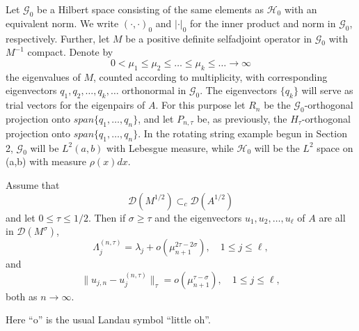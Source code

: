 \documentclass[final]{siamltex}
\numberwithin{equation}{section}
\begin{document}
Let $\mathcal{G}_0$ be a Hilbert space consisting of the same elements as $\mathcal{H}_0$ with an equivalent norm. We write $\left( \cdot, \cdot\right)_0$ and
$| \cdot |_0$ for the inner product and norm in $\mathcal{G}_0$, respectively. Further, let $M$ be a positive definite selfadjoint operator in $\mathcal{G}_0$ with
$M^{-1}$ compact. Denote by
\[0<\mu_1\le \mu_2 \le \ldots \le \mu_k \le \ldots \to \infty\]
the eigenvalues of $M$, counted according to multiplicity, with corresponding eigenvectors $q_1, q_2, \ldots, q_k, \ldots$ orthonormal in $\mathcal{G}_0$.  The eigenvectors $\{q_k \}$ will serve as trial vectors for the eigenpairs of $A$. For this purpose let $R_n$ be the $\mathcal{G}_0$-orthogonal
projection onto $span \{q_1, \ldots, q_n \}$, and
let $P_{n, \tau}$ be, as previously, the $H_{\tau}$-orthogonal projection onto
$span \{q_1, \ldots, q_n \}$.
In the rotating string example begun in Section 2, $\mathcal{G}_0$ will be $L^2(a,b)$ with Lebesgue measure, while $\mathcal{H}_0$ will be the $L^2$ space on (a,b) with measure $\rho(x) dx$.

\begin{proposition} \label{prop4.2} Assume that
\begin{equation} \label{4.1}
\mathcal{D}\left(M^{1/2}\right) \subset_{c} \mathcal{D}\left(A^{1/2}\right)
\end{equation}
and let $0 \le \tau \le 1/2$. Then if $\sigma \ge \tau$ and the eigenvectors $u_1, u_2, \ldots, u_{\ell}$ of $A$ are all in $\mathcal{D}\left(M^{\sigma} \right)$,
\[\Lambda_{j}^{(n, \tau)} = \lambda_j + o \left(\mu_{n+1}^{2 \tau - 2 \sigma}\right),  \quad 1 \le j \le \ell, \]
and
\[\|u_{j,n} - u_j^{(n,\tau)}\|_{\tau}= o\left(\mu_{n+1}^{\tau-
\sigma}\right), \quad 1\le j \le \ell,\]
both as $n\to \infty$.
\end{proposition}
Here ``o'' is the usual Landau symbol ``little oh''.
\end{document}
